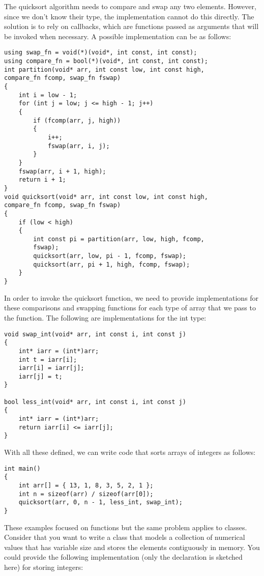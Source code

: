 The quicksort algorithm needs to compare and swap any two elements. However, since we don't know their type, the implementation cannot do this directly. The solution is to rely on callbacks, which are functions passed as arguments that will be invoked when necessary. A possible implementation can be as follows:
\begin{lstlisting}[style=styleCXX]
using swap_fn = void(*)(void*, int const, int const);
using compare_fn = bool(*)(void*, int const, int const);
int partition(void* arr, int const low, int const high,
compare_fn fcomp, swap_fn fswap)
{
	int i = low - 1;
	for (int j = low; j <= high - 1; j++)
	{
		if (fcomp(arr, j, high))
		{
			i++;
			fswap(arr, i, j);
		}
	}
	fswap(arr, i + 1, high);
	return i + 1;
}
void quicksort(void* arr, int const low, int const high,
compare_fn fcomp, swap_fn fswap)
{
	if (low < high)
	{
		int const pi = partition(arr, low, high, fcomp,
		fswap);
		quicksort(arr, low, pi - 1, fcomp, fswap);
		quicksort(arr, pi + 1, high, fcomp, fswap);
	}
}
\end{lstlisting}

In order to invoke the quicksort function, we need to provide implementations for these comparisons and swapping functions for each type of array that we pass to the function. The following are implementations for the int type:

\begin{lstlisting}[style=styleCXX]
void swap_int(void* arr, int const i, int const j)
{
	int* iarr = (int*)arr;
	int t = iarr[i];
	iarr[i] = iarr[j];
	iarr[j] = t;
}

bool less_int(void* arr, int const i, int const j)
{
	int* iarr = (int*)arr;
	return iarr[i] <= iarr[j];
}
\end{lstlisting}

With all these defined, we can write code that sorts arrays of integers as follows:

\begin{lstlisting}[style=styleCXX]
int main()
{
	int arr[] = { 13, 1, 8, 3, 5, 2, 1 };
	int n = sizeof(arr) / sizeof(arr[0]);
	quicksort(arr, 0, n - 1, less_int, swap_int);
}
\end{lstlisting}

These examples focused on functions but the same problem applies to classes. Consider that you want to write a class that models a collection of numerical values that has variable size and stores the elements contiguously in memory. You could provide the following implementation (only the declaration is sketched here) for storing integers:

